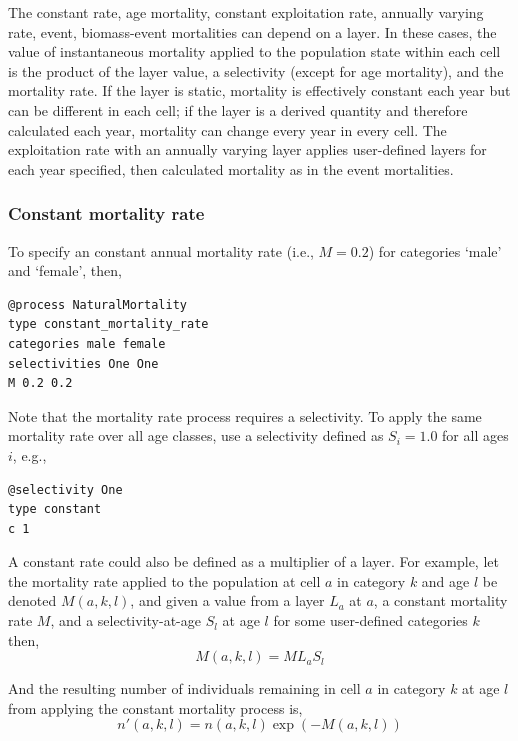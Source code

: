 The constant rate, age mortality, constant exploitation rate, annually varying rate, event, biomass-event mortalities can depend on a layer. In these cases, the value of instantaneous mortality applied to the population state within each cell is the product of the layer value, a selectivity (except for age mortality), and the mortality rate. If the layer is static, mortality is effectively constant each year but can be different in each cell; if the layer is a derived quantity and therefore calculated each year, mortality can change every year in every cell. The exploitation rate with an annually varying layer applies user-defined layers for each year specified, then calculated mortality as in the event mortalities.

\subsubsection*{Constant mortality rate}

To specify an constant annual mortality rate (i.e., $M=0.2$) for categories `male' and `female', then, 
{\small{\begin{verbatim}
@process NaturalMortality
type constant_mortality_rate
categories male female
selectivities One One
M 0.2 0.2
\end{verbatim}}}

Note that the mortality rate process requires a selectivity. To apply the same mortality rate over all age classes, use a selectivity defined as $S_i=1.0$ for all ages $i$, e.g.,
{\small{\begin{verbatim}
@selectivity One
type constant
c 1
\end{verbatim}}}

A constant rate could also be defined as a multiplier of a layer. For example, let the mortality rate applied to the population at cell $a$ in category $k$ and age $l$ be denoted $M(a,k,l)$, and given a value from a layer $L_a$  at $a$, a constant mortality rate $M$, and a selectivity-at-age $S_l$ at age $l$ for some user-defined categories $k$ then, 
\begin{equation}
  M(a,k,l) = ML_a S_l 
\end{equation}

And the resulting number of individuals remaining in cell $a$ in category $k$ at age $l$ from applying the constant mortality process is,
\begin{equation}
  n'(a,k,l) = n(a,k,l) \exp \left({-M(a,k,l)}\right)
\end{equation}

